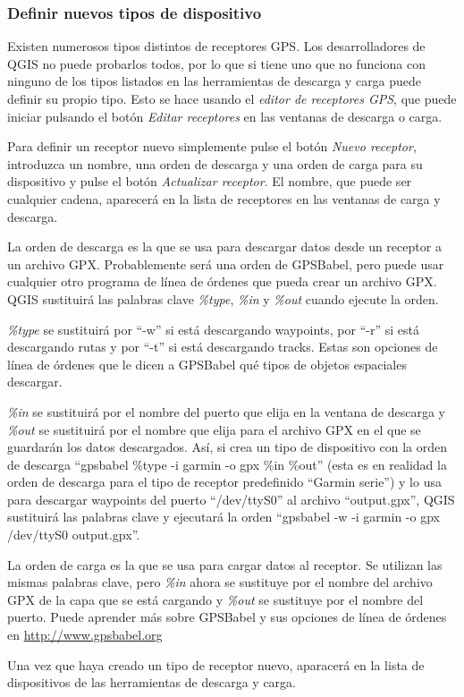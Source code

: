 \subsubsection{\label{sec:Defining-new-device}Definir nuevos tipos de dispositivo}

Existen numerosos tipos distintos de receptores GPS. Los desarrolladores de
QGIS no puede probarlos todos, por lo que si tiene uno que no funciona con 
ninguno de los tipos listados en las herramientas de descarga y carga puede 
definir su propio tipo. Esto se hace usando el \emph{editor de receptores GPS}, 
que puede iniciar pulsando el botón \emph{Editar receptores} en las
ventanas de descarga o carga.

Para definir un receptor nuevo simplemente pulse el botón \emph{Nuevo receptor},
introduzca un nombre, una orden de descarga y una orden de carga para su dispositivo 
y pulse el botón \emph{Actualizar receptor}. El nombre, que puede ser cualquier cadena, aparecerá en la lista
de receptores en las ventanas de carga y descarga.

La orden de descarga es la que se usa para descargar datos desde un 
receptor a un archivo GPX. Probablemente será una orden de GPSBabel, pero
puede usar cualquier otro programa de línea de órdenes que pueda crear un 
archivo GPX. QGIS sustituirá las palabras clave \emph{\%type}, \emph{\%in} y
\emph{\%out} cuando ejecute la orden.

\emph{\%type} se sustituirá por {}``-w'' si está descargando waypoints, por {}``-r''
 si está descargando rutas y por {}``-t'' si está descargando tracks. Estas son opciones
 de línea de órdenes que le dicen a GPSBabel qué tipos de objetos espaciales descargar.

\emph{\%in} se sustituirá por el nombre del puerto que elija en la ventana de
descarga y \emph{\%out} se sustituirá por el nombre que elija para el archivo
GPX en el que se guardarán los datos descargados. Así, si crea un tipo de 
dispositivo con la orden de descarga {}``gpsbabel
\%type -i garmin -o gpx \%in \%out'' (esta es en realidad la orden de descarga 
para el tipo de receptor predefinido {}``Garmin serie'') y lo usa para descargar 
waypoints del puerto {}``/dev/ttyS0'' al archivo {}``output.gpx'', QGIS sustituirá 
las palabras clave y ejecutará la orden {}``gpsbabel -w -i garmin -o gpx /dev/ttyS0 output.gpx''.

La orden de carga es la que se usa para cargar datos al receptor. Se utilizan 
las mismas palabras clave, pero \emph{\%in} ahora se sustituye por el nombre del 
archivo GPX de la capa que se está cargando y \emph{\%out} se sustituye por el nombre 
del puerto. Puede aprender más sobre GPSBabel y sus opciones de línea de órdenes en 
\url{http://www.gpsbabel.org}

Una vez que haya creado un tipo de receptor nuevo, aparacerá en la lista de dispositivos de las herramientas de descarga y carga.